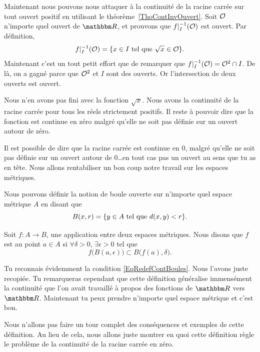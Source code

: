 Maintenant nous pouvons nous attaquer à la continuité de la racine carrée sur tout ouvert positif en utilisant le théorème~\ref{ThoContInvOuvert}. Soit $\mathcal{O}$ n'importe quel ouvert de $\eR$, et prouvons que $f|_I^{-1}(\mathcal{O})$ est ouvert. Par définition,
\begin{equation}
  f|_I^{-1}(\mathcal{O})=\{ x\in I\text{ tel que } \sqrt{x}\in\mathcal{O} \}.
\end{equation}
Maintenant c'est un tout petit effort que de remarquer que $f|_I^{-1}(\mathcal{O})=\mathcal{O}^2\cap I$. De là, on a gagné parce que $\mathcal{O}^2$ et $I$ sont des ouverts. Or l'intersection de deux ouverts est ouvert.

Nous n'en avons pas fini avec la fonction $\sqrt{x}$. Nous avons la continuité de la racine carrée pour tous les réels strictement positifs. Il reste à pouvoir dire que la fonction est continue en zéro malgré qu'elle ne soit pas définie sur un ouvert autour de zéro.

Il est possible de dire que la racine carrée est continue en $0$, malgré qu'elle ne soit pas définie sur un ouvert autour de $0$\ldots en tout cas pas un ouvert au sens que tu as en tête. Nous allons rentabiliser un bon coup notre travail sur les espaces métriques.

Nous pouvons définir la notion de boule ouverte sur n'importe quel espace métrique $A$ en disant que
\[
  B(x,r)=\{ y\in A\text{ tel que } d(x,y)<r \}.
\]
\begin{definition}      \label{DefContMetrique}
Soit $f\colon A\to B$, une application entre deux espaces métriques. Nous disons que $f$ est  au point $a\in A$ si $\forall \delta>0$, $\exists\epsilon>0$ tel que
\begin{equation}
  f\big( B(a,\epsilon) \big)\subset B\big( f(a),\delta \big).
\end{equation}
\end{definition}
Tu reconnais évidemment la condition \eqref{EqRedefContBoules}. Nous l'avons juste recopiée. Tu remarqueras cependant que cette définition généralise immensément la continuité que l'on avait travaillé à propos des fonctions de $\eR$ vers $\eR$. Maintenant tu peux prendre n'importe quel espace métrique et c'est bon.

Nous n'allons pas faire un tour complet des conséquences et exemples de cette définition. Au lieu de cela, nous allons juste montrer en quoi cette définition règle le problème de la continuité de la racine carrée en zéro.

